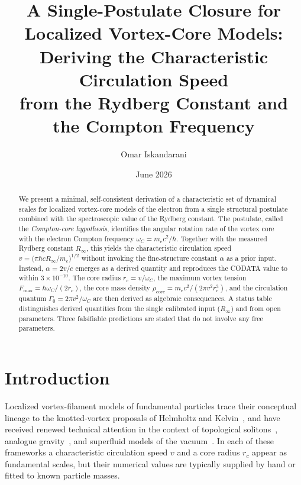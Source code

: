 \documentclass[aps,pra,preprint,longbibliography,nofootinbib]{revtex4-2}
\newcommand{\vc}{v}              %
\newcommand{\rc}{r_c}            %
\newcommand{\omC}{\omega_C}      %
\newcommand{\Rinf}{R_\infty}     %
\newcommand{\Fmax}{F_{\max}}     %
\newcommand{\rhocore}{\rho_{\mathrm{core}}} %
\newcommand{\Gz}{\Gamma_0}       %
\begin{document}
\title{A Single-Postulate Closure for Localized Vortex-Core Models:\\
       Deriving the Characteristic Circulation Speed\\
       from the Rydberg Constant and the Compton Frequency}

\author{Omar Iskandarani}
\date{June 2026}

\begin{abstract}
We present a minimal, self-consistent derivation of a characteristic
set of dynamical scales for localized vortex-core models of the electron
from a single structural postulate combined with the spectroscopic value
of the Rydberg constant.
The postulate, called the \emph{Compton-core hypothesis}, identifies
the angular rotation rate of the vortex core with the electron Compton
frequency $\omC = m_e c^2/\hbar$.
Together with the measured Rydberg constant $\Rinf$, this yields the
characteristic circulation speed
$\vc = \bigl(\pi\hbar c\Rinf/m_e\bigr)^{1/2}$
without invoking the fine-structure constant $\alpha$ as a prior input.
Instead, $\alpha = 2\vc/c$ emerges as a derived quantity and
reproduces the CODATA value to within $3\times 10^{-10}$.
The core radius $\rc = \vc/\omC$, the maximum vortex tension
$\Fmax = \hbar\omC/(2\rc)$, the core mass density
$\rhocore = m_e c^2/(2\pi\vc^2\rc^3)$, and the
circulation quantum $\Gz = 2\pi\vc^2/\omC$ are then derived
as algebraic consequences.
A status table distinguishes derived quantities from the single
calibrated input ($\Rinf$) and from open parameters.
Three falsifiable predictions are stated that do not involve
any free parameters.
\end{abstract}

\maketitle

\section{Introduction}
\label{sec:intro}

Localized vortex-filament models of fundamental particles trace their
conceptual lineage to the knotted-vortex proposals of Helmholtz and
Kelvin~\cite{Helmholtz1867,Kelvin1867}, and have received renewed
technical attention in the context of topological solitons~\cite{FaddeevNiemi1997},
analogue gravity~\cite{Barcelo2005}, and superfluid models of the
vacuum~\cite{Volovik2003}.
In each of these frameworks a characteristic circulation speed $\vc$
and a core radius $\rc$ appear as fundamental scales, but their
numerical values are typically supplied by hand or fitted to known
particle masses.
\end{document}
